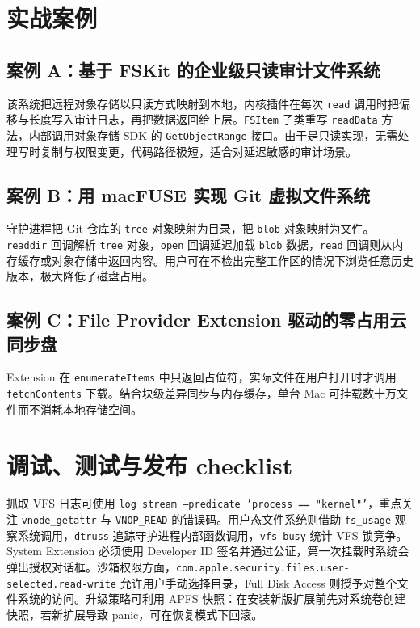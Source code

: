 \chapter{实战案例}
\section{案例 A：基于 FSKit 的企业级只读审计文件系统}
该系统把远程对象存储以只读方式映射到本地，内核插件在每次 \texttt{read} 调用时把偏移与长度写入审计日志，再把数据返回给上层。\texttt{FSItem} 子类重写 \texttt{readData} 方法，内部调用对象存储 SDK 的 \texttt{GetObjectRange} 接口。由于是只读实现，无需处理写时复制与权限变更，代码路径极短，适合对延迟敏感的审计场景。\par
\section{案例 B：用 macFUSE 实现 Git 虚拟文件系统}
守护进程把 Git 仓库的 \texttt{tree} 对象映射为目录，把 \texttt{blob} 对象映射为文件。\texttt{readdir} 回调解析 \texttt{tree} 对象，\texttt{open} 回调延迟加载 \texttt{blob} 数据，\texttt{read} 回调则从内存缓存或对象存储中返回内容。用户可在不检出完整工作区的情况下浏览任意历史版本，极大降低了磁盘占用。\par
\section{案例 C：File Provider Extension 驱动的零占用云同步盘}
Extension 在 \texttt{enumerateItems} 中只返回占位符，实际文件在用户打开时才调用 \texttt{fetchContents} 下载。结合块级差异同步与内存缓存，单台 Mac 可挂载数十万文件而不消耗本地存储空间。\par
\chapter{调试、测试与发布 checklist}
抓取 VFS 日志可使用 \texttt{log stream --predicate 'process == "kernel"'}，重点关注 \texttt{vnode\_{}getattr} 与 \texttt{VNOP\_{}READ} 的错误码。用户态文件系统则借助 \texttt{fs\_{}usage} 观察系统调用，\texttt{dtruss} 追踪守护进程内部函数调用，\texttt{vfs\_{}busy} 统计 VFS 锁竞争。System Extension 必须使用 Developer ID 签名并通过公证，第一次挂载时系统会弹出授权对话框。沙箱权限方面，\texttt{com.apple.security.files.user-selected.read-write} 允许用户手动选择目录，Full Disk Access 则授予对整个文件系统的访问。升级策略可利用 APFS 快照：在安装新版扩展前先对系统卷创建快照，若新扩展导致 panic，可在恢复模式下回滚。\par
